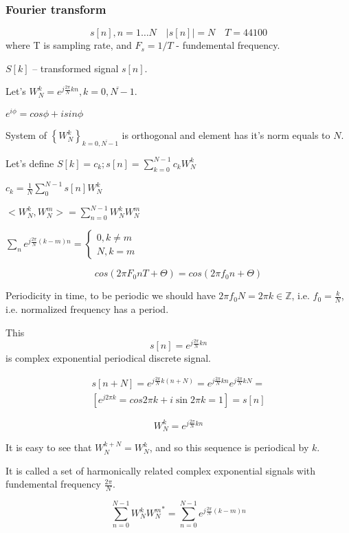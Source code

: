 \documentclass[oneside, final, 14pt]{extarticle}
\begin{document}
\subsubsection{Fourier transform}

$$s[n], n = 1 \dots N \quad |s[n]| = N \quad T = 44100$$
where T is sampling rate, and $F_s = 1 / T$ - fundemental frequency.

$S[k]$ -- transformed signal $s[n]$.

Let's $W_N^k = e^{j\frac{2\pi}{N}kn}, k = \overline{0,N-1}$.

$e^{i\phi} = cos\phi + i sin\phi$

System of $\left\{ W_N^k\right\}_{k=\overline{0,N-1}}$ is orthogonal and
element has it's norm equals to $N$.

Let's define $S[k] = c_k; s[n] = \sum_{k=0}^{N-1}c_kW_N^k$

$c_k = \frac{1}{N} \sum_0^{N-1} s[n] W_N^k$

$<W_N^k,W_N^m> = \sum_{n=0}^{N-1}W_N^kW_N^m$

$\sum_n e^{j\frac{2\pi}{N}(k-m)n} =
\begin{cases}
	0, k\not = m\\
  N, k  = m
\end{cases}$

\[
  cos(2\pi F_0 n T + \Theta) = cos(2 \pi f_0 n + \Theta)
\]

Periodicity in time, to be periodic we should have
$2 \pi f_0 N = 2 \pi k\in \mathbb{Z}$, i.e. $f_0 = \frac{k}{N}$,
i.e. normalized frequency has a period.

This
\[
  s[n] = e^{j\frac{2\pi}{N} k n}
\]
is complex exponential periodical discrete signal.

\begin{multline}
	s[n + N] = e^{ j \frac{2\pi}{N} k (n + N) } =
  e^{ j \frac{2\pi}{N} k n}
	e^{ j \frac{2\pi}{N} k N} = \\
 \left[
   e^{ j 2\pi k} = cos 2 \pi k + i \sin 2 \pi k = 1
 \right]
 = s[n]
\end{multline}

\[
  W_N^k =
  e^{ j \frac{2\pi}{N} k n}
\]

It is easy to see that $W_N^{k+N} = W_N^k$, and so this sequence
is periodical by $k$.

It is called a set of harmonically related complex exponential signals
with fundemental frequency $\frac{2 \pi}{N}$.

\[
  \sum_{n = 0}^{N-1} W_N^k {W_N^m}^* =
  \sum_{n = 0}^{N-1} e^{ j \frac{2\pi}{N} (k - m) n}
\]
\end{document}
